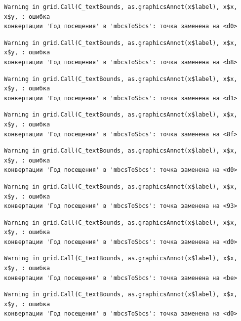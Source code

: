 \documentclass[
  letterpaper,
  DIV=11,
  numbers=noendperiod]{scrreprt}
\begin{document}
\begin{verbatim}
Warning in grid.Call(C_textBounds, as.graphicsAnnot(x$label), x$x, x$y, : ошибка
конвертации 'Год посещения' в 'mbcsToSbcs': точка заменена на <d0>
\end{verbatim}

\begin{verbatim}
Warning in grid.Call(C_textBounds, as.graphicsAnnot(x$label), x$x, x$y, : ошибка
конвертации 'Год посещения' в 'mbcsToSbcs': точка заменена на <b8>
\end{verbatim}

\begin{verbatim}
Warning in grid.Call(C_textBounds, as.graphicsAnnot(x$label), x$x, x$y, : ошибка
конвертации 'Год посещения' в 'mbcsToSbcs': точка заменена на <d1>
\end{verbatim}

\begin{verbatim}
Warning in grid.Call(C_textBounds, as.graphicsAnnot(x$label), x$x, x$y, : ошибка
конвертации 'Год посещения' в 'mbcsToSbcs': точка заменена на <8f>
\end{verbatim}

\begin{verbatim}
Warning in grid.Call(C_textBounds, as.graphicsAnnot(x$label), x$x, x$y, : ошибка
конвертации 'Год посещения' в 'mbcsToSbcs': точка заменена на <d0>
\end{verbatim}

\begin{verbatim}
Warning in grid.Call(C_textBounds, as.graphicsAnnot(x$label), x$x, x$y, : ошибка
конвертации 'Год посещения' в 'mbcsToSbcs': точка заменена на <93>
\end{verbatim}

\begin{verbatim}
Warning in grid.Call(C_textBounds, as.graphicsAnnot(x$label), x$x, x$y, : ошибка
конвертации 'Год посещения' в 'mbcsToSbcs': точка заменена на <d0>
\end{verbatim}

\begin{verbatim}
Warning in grid.Call(C_textBounds, as.graphicsAnnot(x$label), x$x, x$y, : ошибка
конвертации 'Год посещения' в 'mbcsToSbcs': точка заменена на <be>
\end{verbatim}

\begin{verbatim}
Warning in grid.Call(C_textBounds, as.graphicsAnnot(x$label), x$x, x$y, : ошибка
конвертации 'Год посещения' в 'mbcsToSbcs': точка заменена на <d0>
\end{verbatim}
\end{document}
